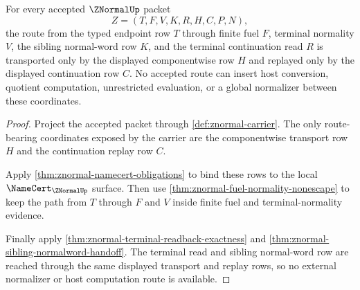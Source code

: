 \begin{theorem}
\label{thm:znormal-route-transport}
For every accepted $\ZNormalUp$ packet
$$
Z=(T,F,V,K,R,H,C,P,N),
$$
the route from the typed endpoint row $T$ through finite fuel $F$, terminal normality $V$, the sibling normal-word row $K$, and the terminal continuation read $R$ is transported only by the displayed componentwise row $H$ and replayed only by the displayed continuation row $C$. No accepted route can insert host conversion, quotient computation, unrestricted evaluation, or a global normalizer between these coordinates.
\end{theorem}
\begin{proof}
Project the accepted packet through \autoref{def:znormal-carrier}. The only route-bearing coordinates exposed by the carrier are the componentwise transport row $H$ and the continuation replay row $C$.

Apply \autoref{thm:znormal-namecert-obligations} to bind these rows to the local $\NameCert_{\ZNormalUp}$ surface. Then use \autoref{thm:znormal-fuel-normality-nonescape} to keep the path from $T$ through $F$ and $V$ inside finite fuel and terminal-normality evidence.

Finally apply \autoref{thm:znormal-terminal-readback-exactness} and \autoref{thm:znormal-sibling-normalword-handoff}. The terminal read and sibling normal-word row are reached through the same displayed transport and replay rows, so no external normalizer or host computation route is available.
\end{proof}
